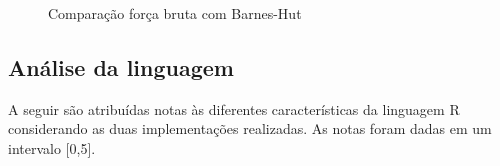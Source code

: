 \documentclass[rel_mlp]{iiufrgs}
\begin{document}
\begin{figure}[htb]
    \centering
    \caption{Comparação força bruta com Barnes-Hut}
    \label{fig:grafico}
\end{figure}



\subsection{Análise da linguagem}

A seguir são atribuídas notas às diferentes características da linguagem R
considerando as duas implementações realizadas.
As notas foram dadas em um intervalo [0,5].
\end{document}
